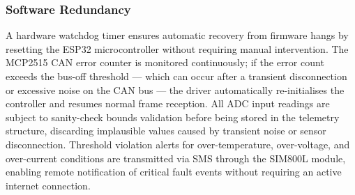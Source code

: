 \subsubsection*{Software Redundancy}

A hardware watchdog timer ensures automatic recovery from firmware hangs by resetting the ESP32 microcontroller without requiring manual intervention. The MCP2515 CAN error counter is monitored continuously; if the error count exceeds the bus-off threshold --- which can occur after a transient disconnection or excessive noise on the CAN bus --- the driver automatically re-initialises the controller and resumes normal frame reception. All ADC input readings are subject to sanity-check bounds validation before being stored in the telemetry structure, discarding implausible values caused by transient noise or sensor disconnection. Threshold violation alerts for over-temperature, over-voltage, and over-current conditions are transmitted via SMS through the SIM800L module, enabling remote notification of critical fault events without requiring an active internet connection.
